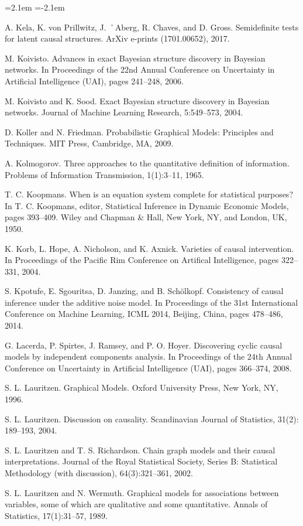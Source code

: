 \begin{list}{}{\leftmargin=2.1em
 \itemindent=-2.1em\parsep=0pt\itemsep=3pt}
\item A. Kela, K. von Prillwitz, J. ˚Aberg, R. Chaves, and D. Gross. Semidefinite tests for latent causal structures. ArXiv e-prints (1701.00652), 2017.
\item M. Koivisto. Advances in exact Bayesian structure discovery in Bayesian networks. In Proceedings of the 22nd Annual Conference on Uncertainty in Artificial Intelligence (UAI), pages 241--248, 2006.
\item M. Koivisto and K. Sood. Exact Bayesian structure discovery in Bayesian networks. Journal of Machine Learning Research, 5:549--573, 2004.
\item D. Koller and N. Friedman. Probabilistic Graphical Models: Principles and Techniques. MIT Press, Cambridge, MA, 2009.
\item A. Kolmogorov. Three approaches to the quantitative definition of information. Problems of Information Transmission, 1(1):3--11, 1965.
\item T. C. Koopmans. When is an equation system complete for statistical purposes? In T. C. Koopmans, editor, Statistical Inference in Dynamic Economic Models, pages 393--409. Wiley and Chapman \& Hall, New York, NY, and London, UK, 1950.
\item K. Korb, L. Hope, A. Nicholson, and K. Axnick. Varieties of causal intervention. In Proceedings of the Pacific Rim Conference on Artifical Intelligence, pages 322--331, 2004.
\item S. Kpotufe, E. Sgouritsa, D. Janzing, and B. Schölkopf. Consistency of causal inference under the additive noise model. In Proceedings of the 31st International Conference on Machine Learning, ICML 2014, Beijing, China, pages 478--486, 2014.
\item G. Lacerda, P. Spirtes, J. Ramsey, and P. O. Hoyer. Discovering cyclic causal models by independent components analysis. In Proceedings of the 24th Annual Conference on Uncertainty in Artificial Intelligence (UAI), pages 366--374, 2008.
\item S. L. Lauritzen. Graphical Models. Oxford University Press, New York, NY, 1996.
\item S. L. Lauritzen. Discussion on causality. Scandinavian Journal of Statistics, 31(2): 189--193, 2004.
\item S. L. Lauritzen and T. S. Richardson. Chain graph models and their causal interpretations. Journal of the Royal Statistical Society, Series B: Statistical Methodology (with discussion), 64(3):321--361, 2002.
\item S. L. Lauritzen and N. Wermuth. Graphical models for associations between variables, some of which are qualitative and some quantitative. Annals of Statistics, 17(1):31--57, 1989.

\end{list}
